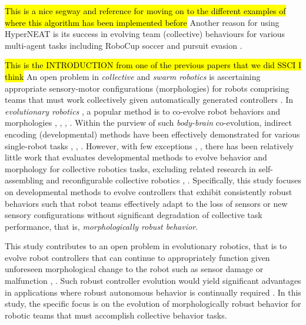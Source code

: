 \documentclass[conference]{IEEEtran}
\begin{document}
\hl{This is a nice segway and reference for moving on to the different examples of where this algorithm has been implemented before}
Another reason for using HyperNEAT is its success in evolving team (collective) behaviours for various multi-agent tasks including RoboCup soccer and pursuit evasion \cite{hausknecht2012hyperneat}.

\hl{This is the INTRODUCTION from one of the previous papers that we did SSCI I think}
An open problem in \textit{collective} \cite{KubeZhang1994B} and \textit{swarm robotics} \cite{Beni2004}
is ascertaining appropriate sensory-motor configurations
(morphologies) for robots comprising teams that must work
collectively given automatically generated controllers \cite{FloreanoDurrMattiussi2008}.
In \textit{evolutionary robotics} \cite{DoncieuxBredecheMouretEiben2015},
a popular method is to co-evolve robot behaviors and morphologies
\cite{LipsonPollack2000}, \cite{Lund2003}, \cite{BuasonBergfeldtZiemke2005}, \cite{AuerbachBongard2014}.
Within the purview of such \textit{body-brain} co-evolution, indirect encoding (developmental) methods
have been effectively demonstrated for various single-robot tasks \cite{MautnerBelew2000},
\cite{HornbyPollack2002}, \cite{CheneyLipson2013}.
However, with few exceptions \cite{AsaiArita2003}, \cite{WatsonNitschke2015SSCI}, \cite{HewlandNitschke2015}
there has been relatively little work that evaluates developmental methods to evolve behavior and morphology
for collective robotics tasks, excluding related research in self-assembling and
reconfigurable collective robotics \cite{OGradyDorigo2012}, \cite{RubensteinCornejoNagpal2014}.
Specifically, this study focuses on developmental methods to evolve controllers that exhibit consistently
robust behaviors such that robot teams effectively adapt to the loss of sensors or new sensory configurations
without significant degradation of collective task performance, that is, \textit{morphologically robust behavior}.

This study contributes to an open problem in evolutionary robotics, that is to evolve
robot controllers that can continue to appropriately function given unforeseen morphological change
to the robot such as sensor damage or malfunction \cite{BongardZykovLipson2006},
\cite{CullyCluneTaraporeMouret2015}.  Such robust controller evolution would yield significant advantages
in applications where robust autonomous behavior is continually required \cite{BrooksFlynn1989}.
In this study, the specific focus is on the evolution of morphologically robust behavior
for robotic teams that must accomplish collective behavior tasks.
\end{document}

